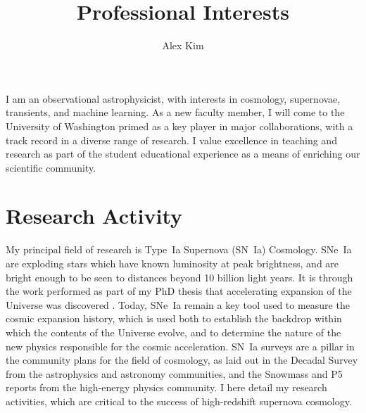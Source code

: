 \documentclass{article}
\begin{document}
\title{Professional Interests}
\author{Alex Kim}
\maketitle

I am an observational astrophysicist, with interests in
cosmology, supernovae, transients, and machine learning.
As a new faculty member, I will come to the University of Washington
primed as a key player in major collaborations, with a
track record in a diverse range of research.  I  value excellence
in teaching and research as part of the student educational experience
as a means of enriching our scientific community.

\section{Research Activity}
My principal field of research is  Type~Ia Supernova (SN~Ia) Cosmology. 
SNe~Ia are exploding stars which have known luminosity at peak brightness, and are  bright enough to be
seen to distances beyond 10 billion light years.  It is through the work
performed as part of my PhD thesis that accelerating
expansion of the Universe was discovered \cite{1997ApJ...483..565P}.  Today, SNe~Ia remain a key tool used
to measure the cosmic expansion history, which is used both to establish
the  backdrop within which the contents of the Universe evolve,
and to determine the nature of the new physics responsible
for the cosmic acceleration.
SN~Ia surveys are a pillar  in the community plans for the field of cosmology,
as laid out in
the Decadal Survey from the astrophysics and astronomy communities, and the Snowmass
\cite{2013arXiv1309.5386D,2013arXiv1309.5382K} and P5 reports
from the high-energy physics community.  I here detail my research activities,
which are critical to the success of high-redshift supernova cosmology.
\end{document}
